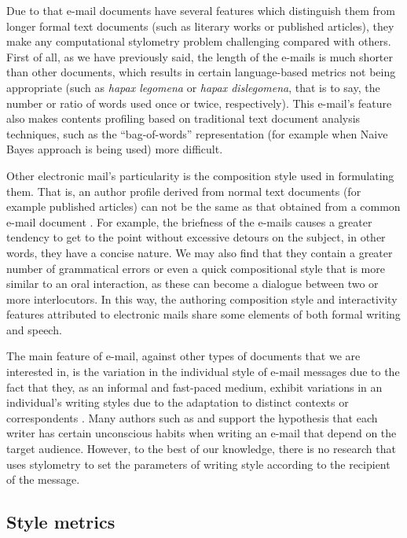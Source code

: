 Due to that e-mail documents have several features which distinguish them from longer formal text documents (such as literary works or published articles), they make any computational stylometry problem challenging compared with others. First of all, as we have previously said, the length of the e-mails is much shorter than other documents, which results in certain language-based metrics not being appropriate (such as \textit{hapax legomena} or \textit{hapax dislegomena}, that is to say, the number or ratio of words used once or twice, respectively). This e-mail's feature also makes contents profiling based on traditional text document analysis techniques, such as the ``bag-of-words'' representation (for example when Naive Bayes approach is being used) more difficult.

Other electronic mail's particularity is the composition style used in formulating them. That is, an author profile derived from normal text documents (for example published articles) can not be the same as that obtained from a common e-mail document \citep{de2001mining}. For example, the briefness of the e-mails causes a greater tendency to get to the point without excessive detours on the subject, in other words, they have a concise nature. We may also find that they contain a greater number of grammatical errors or even a quick compositional style that is more similar to an oral interaction, as these can become a dialogue between two or more interlocutors. In this way, the authoring composition style and interactivity features attributed to electronic mails share some elements of both formal writing and speech.

The main feature of e-mail, against other types of documents that we are interested in, is the variation in the individual style of e-mail messages due to the fact that they, as an informal and fast-paced medium, exhibit variations in an individual's writing styles due to the adaptation to distinct contexts or correspondents \citep{argamon2003style}. Many authors such as \cite{allen1974methods} and \cite{de2001mining} support the hypothesis that each writer has certain unconscious habits when writing an e-mail that depend on the target audience. However, to the best of our knowledge, there is no research that uses stylometry to set the parameters of writing style according to the recipient of the message.

\subsection{Style metrics}\label{ssect:stymet}

